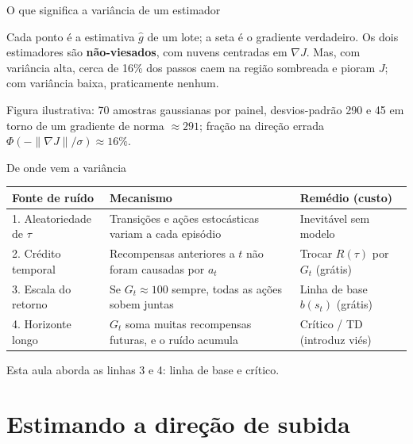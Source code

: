 \documentclass[aspectratio=169, 11pt]{beamer}
\newcommand{\ghat}{\hat{g}}
\newcommand{\azul}[1]{{\color{rlAzulClaro}#1}}
\begin{document}
\begin{frame}{O que significa a variância de um estimador}
  \begin{center}
    
  \end{center}
  \vspace{-0.4em}
  {\small Cada ponto é a estimativa $\ghat$ de um lote; a seta é o gradiente verdadeiro.
  Os dois estimadores são \textbf{não-viesados}, com nuvens centradas em $\nabla J$.
  Mas, com variância alta, cerca de \alert{16\% dos passos} caem na região
  sombreada e pioram $J$; com variância baixa, praticamente nenhum.}

  \vspace{0.2em}
  {\scriptsize\color{rlCinza} Figura ilustrativa: 70 amostras gaussianas por painel, desvios-padrão 290 e 45
  em torno de um gradiente de norma $\approx 291$; fração na direção errada $\Phi(-\|\nabla J\|/\sigma)\approx 16\%$.}
\end{frame}

\begin{frame}{De onde vem a variância}
  \small
  \begin{tabular}{@{}p{}p{}p{}@{}}
    \toprule
    \textbf{Fonte de ruído} & \textbf{Mecanismo} & \textbf{Remédio (custo)} \\
    \midrule
    1. Aleatoriedade de $\tau$ & Transições e ações estocásticas variam a cada episódio & Inevitável sem modelo \\[0.3em]
    2. Crédito temporal & Recompensas anteriores a $t$ não foram causadas por $a_t$ & \azul{Trocar $R(\tau)$ por $G_t$ (grátis)} \\[0.3em]
    3. Escala do retorno & Se $G_t \approx 100$ sempre, todas as ações sobem juntas & \azul{Linha de base $b(s_t)$ (grátis)} \\[0.3em]
    4. Horizonte longo & $G_t$ soma muitas recompensas futuras, e o ruído acumula & {\color{rlLaranja}Crítico / TD (introduz viés)} \\
    \bottomrule
  \end{tabular}

  \vspace{1em}
  Esta aula aborda as linhas 3 e 4: linha de base e crítico.
\end{frame}

\section{Estimando a direção de subida}
\end{document}
